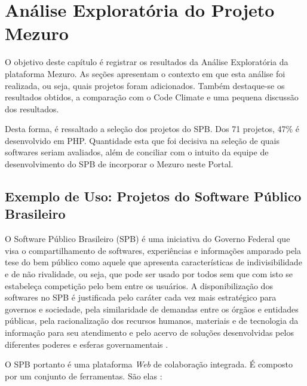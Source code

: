 \chapter{Análise Exploratória do Projeto Mezuro}\label{chap:analise_exploratoria}

O objetivo deste capítulo é registrar os resultados da Análise Exploratória da
plataforma Mezuro. As seções apresentam o contexto em que esta análise foi
realizada, ou seja, quais projetos foram adicionados. Também destaque-se os
resultados obtidos, a comparação com o Code Climate e uma pequena discussão dos
resultados.

Desta forma, é ressaltado a seleção dos projetos do SPB. Dos 71 projetos, 47\% é
desenvolvido em PHP. Quantidade esta que foi decisiva na seleção de quais
softwares seriam avaliados, além de conciliar com o intuito da equipe de
desenvolvimento do SPB de incorporar o Mezuro neste Portal.

\section{Exemplo de Uso: Projetos do Software Público Brasileiro}

O Software Público Brasileiro (SPB) é uma iniciativa do Governo Federal que visa
o compartilhamento de softwares, experiências e informações amparado pela tese
do bem público como aquele que apresenta características de indivisibilidade e
de não rivalidade, ou seja, que pode ser usado por todos sem que com isto se
estabeleça competição pelo bem entre os usuários. A disponibilização dos
softwares no SPB é justificada pelo caráter cada vez mais estratégico para
governos e sociedade, pela similaridade de demandas entre os órgãos e entidades
públicas, pela racionalização dos recursos humanos, materiais e de tecnologia
da informação para seu atendimento e pelo acervo de soluções desenvolvidas
pelos diferentes poderes e esferas governamentais \cite{santos2011in01}.

O SPB portanto é uma plataforma \textit{Web} de colaboração integrada. É composto por um
conjunto de ferramentas. São elas \cite{aboutSPB}:

